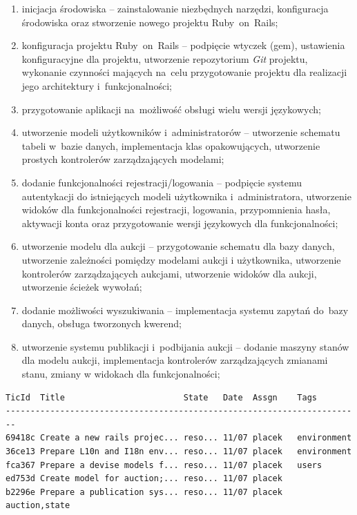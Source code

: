 \begin{enumerate}
  \item inicjacja środowiska -- zainstalowanie niezbędnych narzędzi, konfiguracja środowiska oraz stworzenie nowego projektu Ruby~on~Rails;
  \item konfiguracja projektu Ruby~on~Rails -- podpięcie wtyczek (gem), ustawienia konfiguracyjne dla projektu, utworzenie repozytorium \textit{Git} projektu, wykonanie czynności mających na~celu przygotowanie projektu dla realizacji jego architektury i~funkcjonalności;
  \item przygotowanie aplikacji na~możliwość obsługi wielu wersji językowych;
  \item utworzenie modeli użytkowników i~administratorów -- utworzenie schematu tabeli w~bazie danych, implementacja klas opakowujących, utworzenie prostych kontrolerów zarządzających modelami;
  \item dodanie funkcjonalności rejestracji/logowania -- podpięcie systemu autentykacji do istniejących modeli użytkownika i~administratora, utworzenie widoków dla funkcjonalności rejestracji, logowania, przypomnienia hasła, aktywacji konta oraz przygotowanie wersji językowych dla funkcjonalności;
  \item utworzenie modelu dla aukcji -- przygotowanie schematu dla bazy danych, utworzenie zależności pomiędzy modelami aukcji i użytkownika, utworzenie kontrolerów zarządzających aukcjami, utworzenie widoków dla aukcji, utworzenie ścieżek wywołań;
  \item dodanie możliwości wyszukiwania -- implementacja systemu zapytań do~bazy danych, obsługa tworzonych kwerend;
  \item utworzenie systemu publikacji i~podbijania aukcji -- dodanie maszyny stanów dla modelu aukcji, implementacja kontrolerów zarządzających zmianami stanu, zmiany w widokach dla funkcjonalności;
\end{enumerate}

 \label{code.simpleruby}
\begin{lstlisting}
TicId  Title                        State   Date  Assgn    Tags
------------------------------------------------------------------------
69418c Create a new rails projec... reso... 11/07 placek   environment
36ce13 Prepare L10n and I18n env... reso... 11/07 placek   environment
fca367 Prepare a devise models f... reso... 11/07 placek   users
ed753d Create model for auction;... reso... 11/07 placek
b2296e Prepare a publication sys... reso... 11/07 placek   auction,state
\end{lstlisting}
